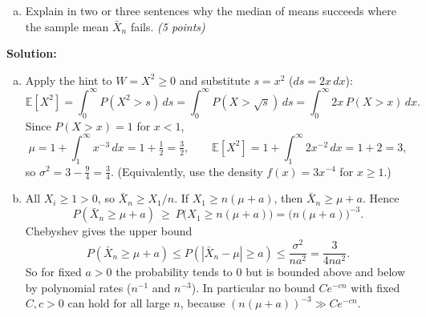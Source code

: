 \documentclass[12pt]{article}
\begin{document}
\begin{enumerate}
\begin{enumerate}[(a)]
\item Explain in two or three sentences why the median of means succeeds where the sample mean $\bar X_n$ fails. {\it (5 points)}
\end{enumerate}

\begin{solution}
\vskip 0.2in
{\bf Solution:}

\begin{enumerate}[(a)]

\item Apply the hint to $W=X^2\ge 0$ and substitute $s=x^2$ ($ds=2x\,dx$):
\[
\mathbb{E}[X^2]=\int_0^\infty P(X^2>s)\,ds=\int_0^\infty P(X>\sqrt s)\,ds=\int_0^\infty 2x\,P(X>x)\,dx.
\]
Since $P(X>x)=1$ for $x<1$,
\[
\mu=1+\int_1^\infty x^{-3}\,dx=1+\tfrac12=\tfrac32,\qquad
\mathbb{E}[X^2]=1+\int_1^\infty 2x^{-2}\,dx=1+2=3,
\]
so $\sigma^2=3-\frac94=\frac34$. (Equivalently, use the density $f(x)=3x^{-4}$ for $x\ge 1$.)

\item All $X_i\ge 1>0$, so $\bar X_n\ge X_1/n$. If $X_1\ge n(\mu+a)$, then $\bar X_n\ge\mu+a$. Hence
\[
P(\bar X_n\ge\mu+a)\ \ge\ P\big(X_1\ge n(\mu+a)\big)=\big(n(\mu+a)\big)^{-3}.
\]
Chebyshev gives the upper bound
\[
P(\bar X_n\ge\mu+a)\le P(|\bar X_n-\mu|\ge a)\le\frac{\sigma^2}{na^2}=\frac{3}{4na^2}.
\]
So for fixed $a>0$ the probability tends to $0$ but is bounded above and below by polynomial rates ($n^{-1}$ and $n^{-3}$). In particular no bound $Ce^{-cn}$ with fixed $C,c>0$ can hold for all large $n$, because $(n(\mu+a))^{-3}\gg Ce^{-cn}$.


\end{enumerate}
\end{solution}
\end{enumerate}
\end{document}
